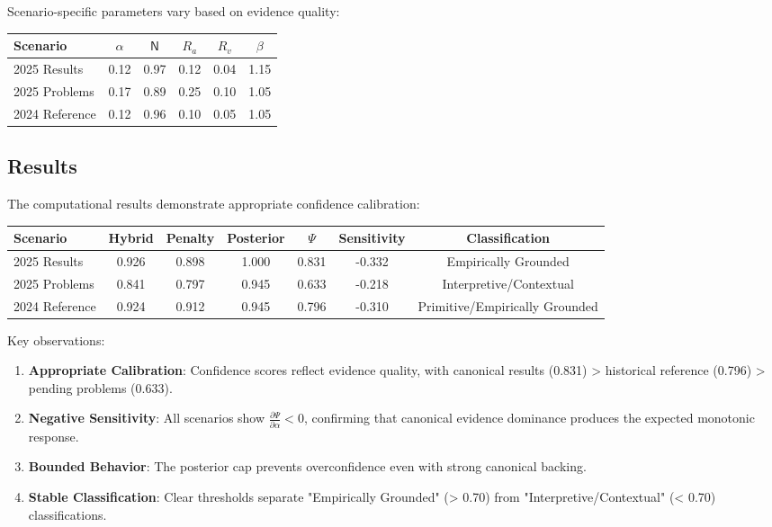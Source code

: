 \documentclass[12pt,a4paper]{article}
\newcommand{\Nsig}{\mathsf{N}}
\newcommand{\alloc}{\alpha}
\newcommand{\rA}{R_a}
\newcommand{\rV}{R_v}
\newcommand{\uplift}{\beta}
\newcommand{\score}{\Psi}
\begin{document}
Scenario-specific parameters vary based on evidence quality:

\begin{center}
\begin{tabular}{@{}lccccc@{}}
\toprule
Scenario & $\alloc$ & $\Nsig$ & $\rA$ & $\rV$ & $\uplift$ \\
\midrule
2025 Results & 0.12 & 0.97 & 0.12 & 0.04 & 1.15 \\
2025 Problems & 0.17 & 0.89 & 0.25 & 0.10 & 1.05 \\
2024 Reference & 0.12 & 0.96 & 0.10 & 0.05 & 1.05 \\
\bottomrule
\end{tabular}
\end{center}

\subsection{Results}

The computational results demonstrate appropriate confidence calibration:

\begin{center}
\begin{tabular}{@{}lcccccc@{}}
\toprule
Scenario & Hybrid & Penalty & Posterior & $\score$ & Sensitivity & Classification \\
\midrule
2025 Results & 0.926 & 0.898 & 1.000 & 0.831 & -0.332 & Empirically Grounded \\
2025 Problems & 0.841 & 0.797 & 0.945 & 0.633 & -0.218 & Interpretive/Contextual \\
2024 Reference & 0.924 & 0.912 & 0.945 & 0.796 & -0.310 & Primitive/Empirically Grounded \\
\bottomrule
\end{tabular}
\end{center}

Key observations:

\begin{enumerate}
\item \textbf{Appropriate Calibration}: Confidence scores reflect evidence quality, with canonical results (0.831) > historical reference (0.796) > pending problems (0.633).

\item \textbf{Negative Sensitivity}: All scenarios show $\frac{\partial \score}{\partial \alloc} < 0$, confirming that canonical evidence dominance produces the expected monotonic response.

\item \textbf{Bounded Behavior}: The posterior cap prevents overconfidence even with strong canonical backing.

\item \textbf{Stable Classification}: Clear thresholds separate "Empirically Grounded" (> 0.70) from "Interpretive/Contextual" (< 0.70) classifications.
\end{enumerate}
\end{document}
